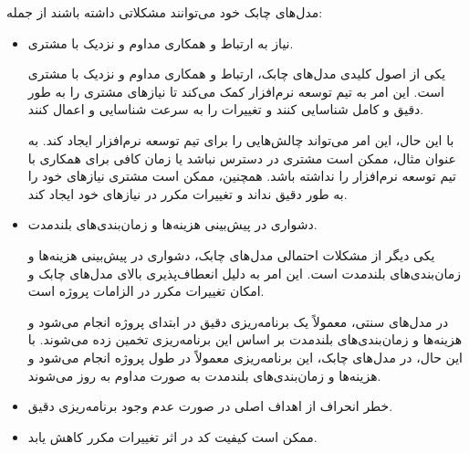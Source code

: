 مدل‌های چابک خود می‌توانند مشکلاتی داشته باشند از جمله:
\begin{itemize}
	\item نیاز به ارتباط و همکاری مداوم و نزدیک با مشتری.
	
	یکی از اصول کلیدی مدل‌های چابک، ارتباط و همکاری مداوم و نزدیک با مشتری است. این امر به تیم توسعه نرم‌افزار کمک می‌کند تا نیازهای مشتری را به طور دقیق و کامل شناسایی کنند و تغییرات را به سرعت شناسایی و اعمال کنند.
	
	با این حال، این امر می‌تواند چالش‌هایی را برای تیم توسعه نرم‌افزار ایجاد کند. به عنوان مثال، ممکن است مشتری در دسترس نباشد یا زمان کافی برای همکاری با تیم توسعه نرم‌افزار را نداشته باشد. همچنین، ممکن است مشتری نیازهای خود را به طور دقیق نداند و تغییرات مکرر در نیازهای خود ایجاد کند.
	
	\item دشواری در پیش‌بینی هزینه‌ها و زمان‌بندی‌های بلندمدت.
	
	یکی دیگر از مشکلات احتمالی مدل‌های چابک، دشواری در پیش‌بینی هزینه‌ها و زمان‌بندی‌های بلندمدت است. این امر به دلیل انعطاف‌پذیری بالای مدل‌های چابک و امکان تغییرات مکرر در الزامات پروژه است.
	
	در مدل‌های سنتی، معمولاً یک برنامه‌ریزی دقیق در ابتدای پروژه انجام می‌شود و هزینه‌ها و زمان‌بندی‌های بلندمدت بر اساس این برنامه‌ریزی تخمین زده می‌شوند. با این حال، در مدل‌های چابک، این برنامه‌ریزی معمولاً در طول پروژه انجام می‌شود و هزینه‌ها و زمان‌بندی‌های بلندمدت به صورت مداوم به روز می‌شوند.
	
	\item خطر انحراف از اهداف اصلی در صورت عدم وجود برنامه‌ریزی دقیق.
	\item ممکن است کیفیت کد در اثر تغییرات مکرر کاهش یابد.
\end{itemize}


